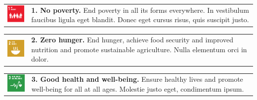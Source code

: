 \begin{multicols}{2}
    
    \small
    \setlength\tabcolsep{0pt}
    \renewcommand*{\arraystretch}{1}

    \noindent
    \begin{tabular}{p{25mm} p{46mm}}
        \vspace{0mm} \includegraphics[width=2cm]{text/appendix/appendix-sdg/resources/sdg1.pdf} & \vspace{-0.5mm} \textbf{1. No poverty.} End poverty in all its forms everywhere. In vestibulum faucibus ligula eget blandit. Donec eget cursus risus, quis suscipit justo. \\
    \end{tabular}

    \noindent
    \begin{tabular}{p{25mm} p{46mm}}
        \vspace{0mm} \includegraphics[width=2cm]{text/appendix/appendix-sdg/resources/sdg2.pdf} & \vspace{-0.5mm} \textbf{2. Zero hunger.} End hunger, achieve food security and improved nutrition and promote sustainable agriculture. Nulla elementum orci in dolor. \\
    \end{tabular}

    \noindent
    \begin{tabular}{p{25mm} p{46mm}}
        \vspace{0mm} \includegraphics[width=2cm]{text/appendix/appendix-sdg/resources/sdg3.pdf} & \vspace{-0.5mm} \textbf{3. Good health and well-being.} Ensure healthy lives and promote well-being for all at all ages. Molestie justo eget, condimentum ipsum.\\
    \end{tabular}


\end{multicols}
